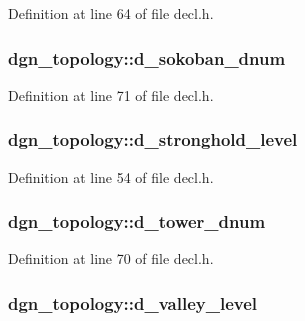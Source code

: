 Definition at line 64 of file decl.\+h.

\hypertarget{structdgn__topology_ad804c0fcfcb97df2acbdd5543f9b9f92}{
\subsubsection[{d\+\_\+sokoban\+\_\+dnum}]{ dgn\+\_\+topology\+::d\+\_\+sokoban\+\_\+dnum}}\label{structdgn__topology_ad804c0fcfcb97df2acbdd5543f9b9f92}


Definition at line 71 of file decl.\+h.

\hypertarget{structdgn__topology_a0bb650c2cd47240d4e303cd5bfdf6843}{
\subsubsection[{d\+\_\+stronghold\+\_\+level}]{ dgn\+\_\+topology\+::d\+\_\+stronghold\+\_\+level}}\label{structdgn__topology_a0bb650c2cd47240d4e303cd5bfdf6843}


Definition at line 54 of file decl.\+h.

\hypertarget{structdgn__topology_a6cfa7f2b1c8d47357b966af07e431209}{
\subsubsection[{d\+\_\+tower\+\_\+dnum}]{ dgn\+\_\+topology\+::d\+\_\+tower\+\_\+dnum}}\label{structdgn__topology_a6cfa7f2b1c8d47357b966af07e431209}


Definition at line 70 of file decl.\+h.

\hypertarget{structdgn__topology_a39e2bbb872644673cb386ddc03f5a613}{
\subsubsection[{d\+\_\+valley\+\_\+level}]{ dgn\+\_\+topology\+::d\+\_\+valley\+\_\+level}}\label{structdgn__topology_a39e2bbb872644673cb386ddc03f5a613}


